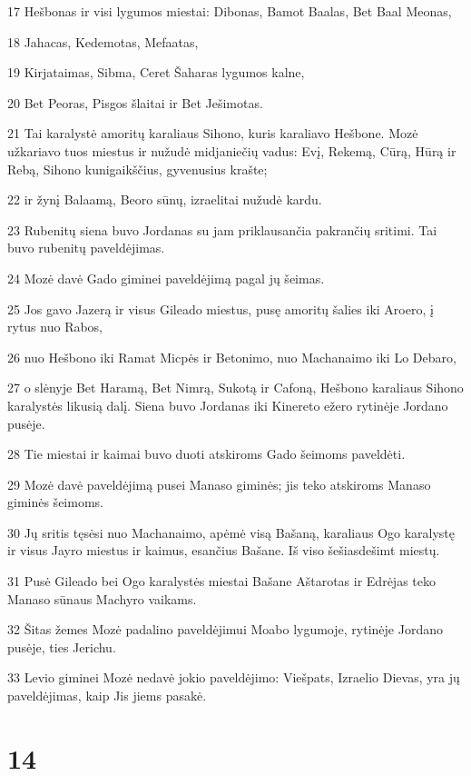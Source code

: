 \par 17 Hešbonas ir visi lygumos miestai: Dibonas, Bamot Baalas, Bet Baal Meonas, 
\par 18 Jahacas, Kedemotas, Mefaatas, 
\par 19 Kirjataimas, Sibma, Ceret Šaharas lygumos kalne, 
\par 20 Bet Peoras, Pisgos šlaitai ir Bet Ješimotas. 
\par 21 Tai karalystė amoritų karaliaus Sihono, kuris karaliavo Hešbone. Mozė užkariavo tuos miestus ir nužudė midjaniečių vadus: Evį, Rekemą, Cūrą, Hūrą ir Rebą, Sihono kunigaikščius, gyvenusius krašte; 
\par 22 ir žynį Balaamą, Beoro sūnų, izraelitai nužudė kardu. 
\par 23 Rubenitų siena buvo Jordanas su jam priklausančia pakrančių sritimi. Tai buvo rubenitų paveldėjimas. 
\par 24 Mozė davė Gado giminei paveldėjimą pagal jų šeimas. 
\par 25 Jos gavo Jazerą ir visus Gileado miestus, pusę amoritų šalies iki Aroero, į rytus nuo Rabos, 
\par 26 nuo Hešbono iki Ramat Micpės ir Betonimo, nuo Machanaimo iki Lo Debaro, 
\par 27 o slėnyje Bet Haramą, Bet Nimrą, Sukotą ir Cafoną, Hešbono karaliaus Sihono karalystės likusią dalį. Siena buvo Jordanas iki Kinereto ežero rytinėje Jordano pusėje. 
\par 28 Tie miestai ir kaimai buvo duoti atskiroms Gado šeimoms paveldėti. 
\par 29 Mozė davė paveldėjimą pusei Manaso giminės; jis teko atskiroms Manaso giminės šeimoms. 
\par 30 Jų sritis tęsėsi nuo Machanaimo, apėmė visą Bašaną, karaliaus Ogo karalystę ir visus Jayro miestus ir kaimus, esančius Bašane. Iš viso šešiasdešimt miestų. 
\par 31 Pusė Gileado bei Ogo karalystės miestai Bašane Aštarotas ir Edrėjas teko Manaso sūnaus Machyro vaikams. 
\par 32 Šitas žemes Mozė padalino paveldėjimui Moabo lygumoje, rytinėje Jordano pusėje, ties Jerichu. 
\par 33 Levio giminei Mozė nedavė jokio paveldėjimo: Viešpats, Izraelio Dievas, yra jų paveldėjimas, kaip Jis jiems pasakė.



\chapter{14}


